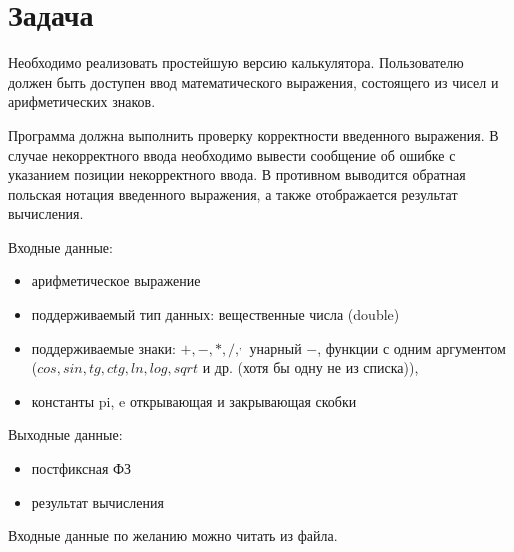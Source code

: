 \section*{Задача}

Необходимо реализовать простейшую версию калькулятора.
Пользователю должен быть доступен ввод математического выражения,
состоящего из чисел и арифметических знаков.

Программа должна выполнить проверку корректности введенного выражения.
В случае некорректного ввода необходимо вывести сообщение об ошибке
с указанием позиции некорректного ввода.
В противном выводится обратная польская нотация введенного
выражения, а также отображается результат вычисления.

Входные данные:

\begin{itemize}
    \item арифметическое выражение
    \item поддерживаемый тип данных: вещественные числа (double)
    \item поддерживаемые знаки: $ +, -, *, /, ^, $ унарный $ - $, функции с одним
    аргументом ($ cos, sin, tg, ctg, ln, log, sqrt $ и др. (хотя бы одну не из списка)),
    \item константы pi, e открывающая и закрывающая скобки
\end{itemize}

Выходные данные:

\begin{itemize}
    \item постфиксная ФЗ
    \item результат вычисления
\end{itemize}

Входные данные по желанию можно читать из файла.